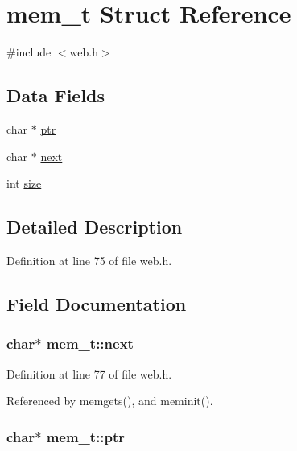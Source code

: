 \hypertarget{structmem__t}{}\section{mem\+\_\+t Struct Reference}
\label{structmem__t}


{\ttfamily \#include $<$web.\+h$>$}

\subsection*{Data Fields}
\begin{DoxyCompactItemize}
\item 
char $\ast$ \hyperlink{structmem__t_af9fd184846ee12236e952731fa592a74}{ptr}
\item 
char $\ast$ \hyperlink{structmem__t_a57b0ca2400c977d234c77e9d20a03c46}{next}
\item 
int \hyperlink{structmem__t_ab04d46fb2982c9a26a26244286c1b33b}{size}
\end{DoxyCompactItemize}


\subsection{Detailed Description}


Definition at line 75 of file web.\+h.



\subsection{Field Documentation}
\subsubsection[{\texorpdfstring{next}{next}}]{\setlength{\rightskip}{0pt plus 5cm}char$\ast$ mem\+\_\+t\+::next}\hypertarget{structmem__t_a57b0ca2400c977d234c77e9d20a03c46}{}\label{structmem__t_a57b0ca2400c977d234c77e9d20a03c46}


Definition at line 77 of file web.\+h.



Referenced by memgets(), and meminit().

\subsubsection[{\texorpdfstring{ptr}{ptr}}]{\setlength{\rightskip}{0pt plus 5cm}char$\ast$ mem\+\_\+t\+::ptr}\hypertarget{structmem__t_af9fd184846ee12236e952731fa592a74}{}\label{structmem__t_af9fd184846ee12236e952731fa592a74}


